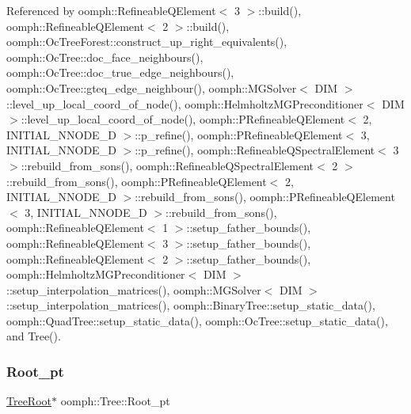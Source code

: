 Referenced by oomph\+::\+Refineable\+Q\+Element$<$ 3 $>$\+::build(), oomph\+::\+Refineable\+Q\+Element$<$ 2 $>$\+::build(), oomph\+::\+Oc\+Tree\+Forest\+::construct\+\_\+up\+\_\+right\+\_\+equivalents(), oomph\+::\+Oc\+Tree\+::doc\+\_\+face\+\_\+neighbours(), oomph\+::\+Oc\+Tree\+::doc\+\_\+true\+\_\+edge\+\_\+neighbours(), oomph\+::\+Oc\+Tree\+::gteq\+\_\+edge\+\_\+neighbour(), oomph\+::\+M\+G\+Solver$<$ D\+I\+M $>$\+::level\+\_\+up\+\_\+local\+\_\+coord\+\_\+of\+\_\+node(), oomph\+::\+Helmholtz\+M\+G\+Preconditioner$<$ D\+I\+M $>$\+::level\+\_\+up\+\_\+local\+\_\+coord\+\_\+of\+\_\+node(), oomph\+::\+P\+Refineable\+Q\+Element$<$ 2, I\+N\+I\+T\+I\+A\+L\+\_\+\+N\+N\+O\+D\+E\+\_\+D $>$\+::p\+\_\+refine(), oomph\+::\+P\+Refineable\+Q\+Element$<$ 3, I\+N\+I\+T\+I\+A\+L\+\_\+\+N\+N\+O\+D\+E\+\_\+D $>$\+::p\+\_\+refine(), oomph\+::\+Refineable\+Q\+Spectral\+Element$<$ 3 $>$\+::rebuild\+\_\+from\+\_\+sons(), oomph\+::\+Refineable\+Q\+Spectral\+Element$<$ 2 $>$\+::rebuild\+\_\+from\+\_\+sons(), oomph\+::\+P\+Refineable\+Q\+Element$<$ 2, I\+N\+I\+T\+I\+A\+L\+\_\+\+N\+N\+O\+D\+E\+\_\+D $>$\+::rebuild\+\_\+from\+\_\+sons(), oomph\+::\+P\+Refineable\+Q\+Element$<$ 3, I\+N\+I\+T\+I\+A\+L\+\_\+\+N\+N\+O\+D\+E\+\_\+D $>$\+::rebuild\+\_\+from\+\_\+sons(), oomph\+::\+Refineable\+Q\+Element$<$ 1 $>$\+::setup\+\_\+father\+\_\+bounds(), oomph\+::\+Refineable\+Q\+Element$<$ 3 $>$\+::setup\+\_\+father\+\_\+bounds(), oomph\+::\+Refineable\+Q\+Element$<$ 2 $>$\+::setup\+\_\+father\+\_\+bounds(), oomph\+::\+Helmholtz\+M\+G\+Preconditioner$<$ D\+I\+M $>$\+::setup\+\_\+interpolation\+\_\+matrices(), oomph\+::\+M\+G\+Solver$<$ D\+I\+M $>$\+::setup\+\_\+interpolation\+\_\+matrices(), oomph\+::\+Binary\+Tree\+::setup\+\_\+static\+\_\+data(), oomph\+::\+Quad\+Tree\+::setup\+\_\+static\+\_\+data(), oomph\+::\+Oc\+Tree\+::setup\+\_\+static\+\_\+data(), and Tree().

\mbox{\label{classoomph_1_1Tree_a61782afd668561ad7ab324f658ffeb6a}} 
\subsubsection{\texorpdfstring{Root\+\_\+pt}{Root\_pt}}
{\footnotesize\ttfamily \hyperlink{classoomph_1_1TreeRoot}{Tree\+Root}$\ast$ oomph\+::\+Tree\+::\+Root\+\_\+pt\hspace{0.3cm}{\ttfamily [protected]}}



